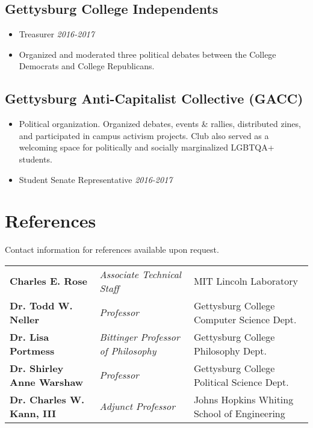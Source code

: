 \documentclass[11pt]{article}
\begin{document}
\subsection*{Gettysburg College Independents} 
\begin{itemize}[noitemsep]
	\item Treasurer \hfill \textit{2016-2017}
    \item Organized and moderated three political debates between the College Democrats and College Republicans. 
\end{itemize}

\subsection*{Gettysburg Anti-Capitalist Collective (GACC)}
\begin{itemize}[noitemsep]
    \item Political organization. Organized debates, events \& rallies, distributed zines, and participated in campus activism projects. Club also served as a welcoming space for politically and socially marginalized LGBTQA+ students.
    \item Student Senate Representative \hfill \textit{2016-2017}
\end{itemize}


\section*{References}
Contact information for references available upon request. \\

\begin{tabular}{ l l l }
	\textbf{Charles E. Rose} & \textit{Associate Technical Staff} & MIT Lincoln Laboratory \\
	\textbf{Dr. Todd W. Neller} & \textit{Professor} & Gettysburg College Computer Science Dept. \\
	\textbf{Dr. Lisa Portmess} & \textit{Bittinger Professor of Philosophy} & Gettysburg College Philosophy Dept. \\
	\textbf{Dr. Shirley Anne Warshaw} & \textit{Professor} & Gettysburg College Political Science Dept. \\
	\textbf{Dr. Charles W. Kann, III} & \textit{Adjunct Professor} & Johns Hopkins Whiting School of Engineering \\
\end{tabular}
\end{document}
